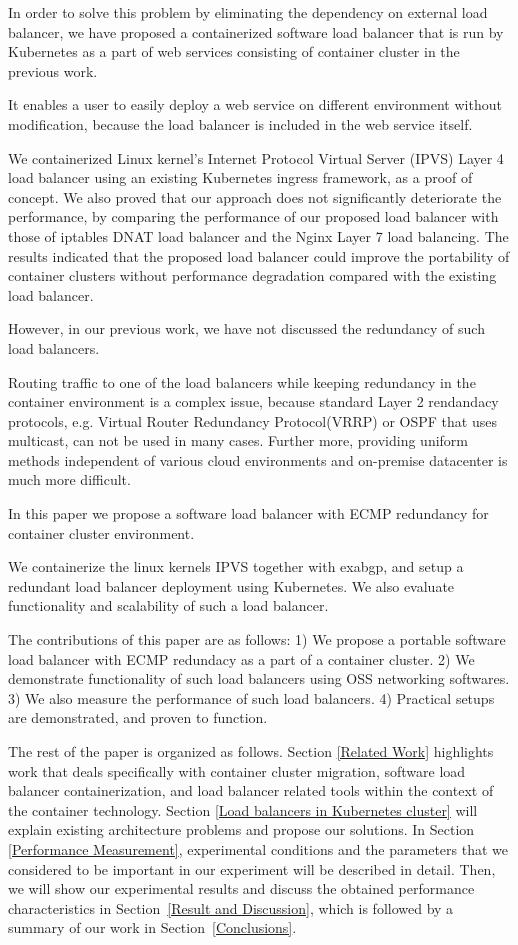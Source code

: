 In order to solve this problem by eliminating the dependency on external load balancer,
we have proposed a containerized software load balancer that is run by Kubernetes as  
a part of web services consisting of container cluster in the previous work\cite{Takahashi2018}.

It enables a user to easily deploy a web service on different environment without modification, 
because the load balancer is included in the web service itself. 

We containerized Linux kernel's Internet Protocol Virtual Server (IPVS)\cite{Zhang2000} 
Layer 4 load balancer using an existing Kubernetes ingress\cite{K8sIngress2017} framework, as a proof of concept.
%
%
We also proved that our approach does not significantly deteriorate the performance,  
by comparing the performance of our proposed load balancer with those of 
iptables DNAT load balancer and the Nginx Layer 7 load balancing. 
%
The results indicated that the proposed load balancer could improve the portability of container clusters 
without performance degradation compared with the existing load balancer.

However, in our previous work, we have not discussed the redundancy of such load balancers.

Routing traffic to one of the load balancers while keeping redundancy in the container environment is a complex issue,
because standard Layer 2 rendandacy protocols, e.g. Virtual Router Redundancy Protocol(VRRP) or OSPF\cite{moy1997ospf} that uses multicast, 
can not be used in many cases.
Further more, providing uniform methods independent of various cloud environments and on-premise datacenter is much more difficult.   

In this paper we propose a software load balancer with ECMP redundancy for container cluster environment.

We containerize the linux kernels IPVS together with exabgp, and setup a redundant load balancer deployment using Kubernetes.
We also evaluate functionality and scalability of such a load balancer.


The contributions of this paper are as follows: 
1) We propose a portable software load balancer with ECMP redundacy as a part of a container cluster.
2) We demonstrate functionality of such load balancers using OSS networking softwares.
3) We also measure the performance of such load balancers.
4) Practical setups are demonstrated, and proven to function.

The rest of the paper is organized as follows.
Section \ref{Related Work} highlights work that deals specifically with container cluster migration, 
software load balancer containerization, and load balancer related tools within the context of the container technology. 
Section \ref{Load balancers in Kubernetes cluster} will explain existing architecture problems and propose our solutions.
In Section \ref{Performance Measurement}, experimental conditions and the parameters 
that we considered to be important in our experiment will be described in detail.
Then, we will show our experimental results and discuss the obtained performance characteristics in Section~\ref{Result and Discussion},  
which is followed by a summary of our work in Section~\ref{Conclusions}.

